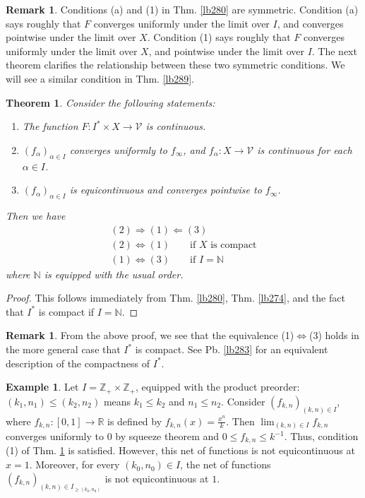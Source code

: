 \documentclass[12pt,b5paper,notitlepage]{article}
\theoremstyle{definition}
\newtheorem{eg}[df]{Example}
\newtheorem{rem}[df]{Remark}
\theoremstyle{plain}
\newtheorem{thm}[df]{Theorem}
\newcommand{\mc}{\mathcal}
\newcommand{\Nbb}{\mathbb N}
\newcommand{\Zbb}{\mathbb Z}
\newcommand{\Rbb}{\mathbb R}
\newcommand{\dps}{\displaystyle}
\numberwithin{equation}{section}
\begin{document}
\begin{rem}\label{lb340}
Conditions (a) and (1) in Thm. \ref{lb280} are symmetric. Condition (a) says roughly that $F$ converges uniformly under the limit over $I$, and converges pointwise under the limit over $X$. Condition (1) says roughly that $F$ converges uniformly under the limit over $X$, and pointwise under the limit over $I$. The next theorem clarifies the relationship between these two symmetric conditions. We will see a similar condition in Thm. \ref{lb289}.
\end{rem}



\begin{thm}\label{lb277}
Consider the following statements:
\begin{enumerate}
\item[(1)] The function $F:I^*\times X\rightarrow\mc V$ is continuous.
\item[(2)] $(f_\alpha)_{\alpha\in I}$ converges uniformly to $f_\infty$, and $f_\alpha:X\rightarrow\mc V$ is continuous for each $\alpha\in I$.
\item[(3)] $(f_\alpha)_{\alpha\in I}$ is equicontinuous and converges pointwise to $f_\infty$.
\end{enumerate}
Then we have
\begin{gather*}
(2)\Longrightarrow(1)\Longleftarrow (3)\\
(2)\Longleftrightarrow(1)\qquad \text{if $X$ is compact}\\
(1)\Longleftrightarrow (3) \qquad \text{if }I=\Nbb
\end{gather*}
where $\Nbb$ is equipped with the usual order.
\end{thm}






\begin{proof}
This follows immediately from Thm. \ref{lb280}, Thm. \ref{lb274}, and the fact that $I^*$ is compact if $I=\Nbb$. 
\end{proof}

\begin{rem}
From the above proof, we see that the equivalence (1)$\Leftrightarrow$(3) holds in the more general case that $I^*$ is compact. See Pb. \ref{lb283} for an equivalent description of the compactness of $I^*$.
\end{rem}


\begin{eg}
Let $I=\Zbb_+\times\Zbb_+$, equipped with the product preorder: $(k_1,n_1)\leq (k_2,n_2)$ means $k_1\leq k_2$ and $n_1\leq n_2$. Consider $(f_{k,n})_{(k,n)\in I}$, where $f_{k,n}:[0,1]\rightarrow\Rbb$ is defined by $\dps f_{k,n}(x)=\frac{x^n}{k}$. Then $\lim_{(k,n)\in I}f_{k,n}$ converges uniformly to $0$ by squeeze theorem and $0\leq f_{k,n}\leq k^{-1}$. Thus, condition (1) of Thm. \ref{lb277} is satisfied. However, this net of functions is not equicontinuous at $x=1$. Moreover, for every $(k_0,n_0)\in I$, the net of functions $(f_{k,n})_{(k,n)\in I_{\geq(k_0,n_0)}}$ is not equicontinuous at $1$.
\end{eg}
\end{document}
